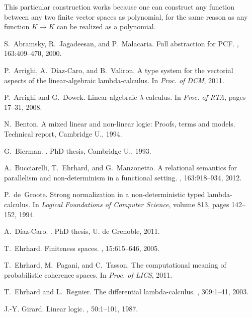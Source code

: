 \documentclass[10pt]{article}
\theoremstyle{plain}
\theoremstyle{definition}
\begin{document}
This particular construction works because one can construct any
function between any two finite vector spaces as polynomial, for the
same reason as any function $K\to K$ can be realized as a polynomial.


\begin{thebibliography}{10}

S.~Abramsky, R.~Jagadeesan, and P.~Malacaria.
\newblock Full abstraction for {PCF}.
, 163:409--470, 2000.

P.~Arrighi, A.~D\'{i}az-Caro, and B.~Valiron.
\newblock A type system for the vectorial aspects of the linear-algebraic
  lambda-calculus.
\newblock In {\em Proc. of DCM}, 2011.

P.~Arrighi and G.~Dowek.
\newblock Linear-algebraic $\lambda$-calculus.
\newblock In {\em Proc. of RTA}, pages 17--31, 2008.

N.~Benton.
\newblock A mixed linear and non-linear logic: Proofs, terms and models.
\newblock Technical report, Cambridge U., 1994.

G.~Bierman.
.
\newblock PhD thesis, Cambridge U., 1993.

A.~Bucciarelli, T.~Ehrhard, and G.~Manzonetto.
\newblock A relational semantics for parallelism and non-determinism in a
  functional setting.
, 163:918--934, 2012.

P.~de~Groote.
\newblock Strong normalization in a non-deterministic typed lambda-calculus.
\newblock In {\em Logical Foundations of Computer Science}, volume 813, pages
  142--152, 1994.

A.~D\'{i}az-Caro.
.
\newblock PhD thesis, U. de Grenoble, 2011.

T.~Ehrhard.
\newblock Finiteness spaces.
, 15:615--646, 2005.

T.~Ehrhard, M.~Pagani, and C.~Tasson.
\newblock The computational meaning of probabilistic coherence spaces.
\newblock In {\em Proc. of LICS}, 2011.

T.~Ehrhard and L.~Regnier.
\newblock The differential lambda-calculus.
, 309:1--41, 2003.

J.-Y. Girard.
\newblock Linear logic.
, 50:1--101, 1987.


\end{thebibliography}
\end{document}
